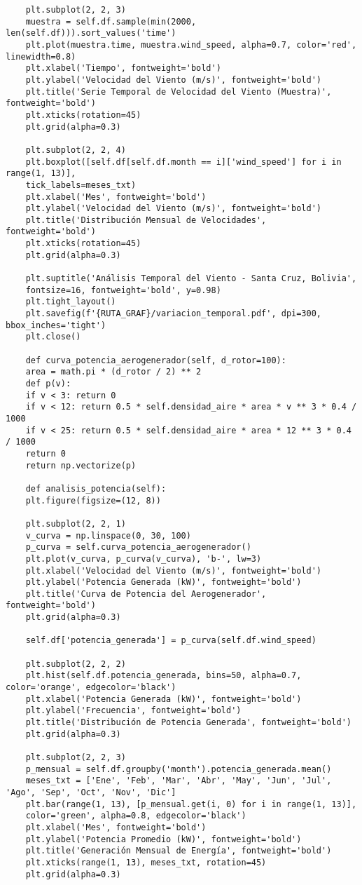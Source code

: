 \begin{lstlisting}
	plt.subplot(2, 2, 3)
	muestra = self.df.sample(min(2000, len(self.df))).sort_values('time')
	plt.plot(muestra.time, muestra.wind_speed, alpha=0.7, color='red', linewidth=0.8)
	plt.xlabel('Tiempo', fontweight='bold')
	plt.ylabel('Velocidad del Viento (m/s)', fontweight='bold')
	plt.title('Serie Temporal de Velocidad del Viento (Muestra)', fontweight='bold')
	plt.xticks(rotation=45)
	plt.grid(alpha=0.3)
	
	plt.subplot(2, 2, 4)
	plt.boxplot([self.df[self.df.month == i]['wind_speed'] for i in range(1, 13)],
	tick_labels=meses_txt)
	plt.xlabel('Mes', fontweight='bold')
	plt.ylabel('Velocidad del Viento (m/s)', fontweight='bold')
	plt.title('Distribución Mensual de Velocidades', fontweight='bold')
	plt.xticks(rotation=45)
	plt.grid(alpha=0.3)
	
	plt.suptitle('Análisis Temporal del Viento - Santa Cruz, Bolivia', 
	fontsize=16, fontweight='bold', y=0.98)
	plt.tight_layout()
	plt.savefig(f'{RUTA_GRAF}/variacion_temporal.pdf', dpi=300, bbox_inches='tight')
	plt.close()
	
	def curva_potencia_aerogenerador(self, d_rotor=100):
	area = math.pi * (d_rotor / 2) ** 2
	def p(v):
	if v < 3: return 0
	if v < 12: return 0.5 * self.densidad_aire * area * v ** 3 * 0.4 / 1000
	if v < 25: return 0.5 * self.densidad_aire * area * 12 ** 3 * 0.4 / 1000
	return 0
	return np.vectorize(p)
	
	def analisis_potencia(self):
	plt.figure(figsize=(12, 8))
	
	plt.subplot(2, 2, 1)
	v_curva = np.linspace(0, 30, 100)
	p_curva = self.curva_potencia_aerogenerador()
	plt.plot(v_curva, p_curva(v_curva), 'b-', lw=3)
	plt.xlabel('Velocidad del Viento (m/s)', fontweight='bold')
	plt.ylabel('Potencia Generada (kW)', fontweight='bold')
	plt.title('Curva de Potencia del Aerogenerador', fontweight='bold')
	plt.grid(alpha=0.3)
	
	self.df['potencia_generada'] = p_curva(self.df.wind_speed)
	
	plt.subplot(2, 2, 2)
	plt.hist(self.df.potencia_generada, bins=50, alpha=0.7, color='orange', edgecolor='black')
	plt.xlabel('Potencia Generada (kW)', fontweight='bold')
	plt.ylabel('Frecuencia', fontweight='bold')
	plt.title('Distribución de Potencia Generada', fontweight='bold')
	plt.grid(alpha=0.3)
	
	plt.subplot(2, 2, 3)
	p_mensual = self.df.groupby('month').potencia_generada.mean()
	meses_txt = ['Ene', 'Feb', 'Mar', 'Abr', 'May', 'Jun', 'Jul', 'Ago', 'Sep', 'Oct', 'Nov', 'Dic']
	plt.bar(range(1, 13), [p_mensual.get(i, 0) for i in range(1, 13)],
	color='green', alpha=0.8, edgecolor='black')
	plt.xlabel('Mes', fontweight='bold')
	plt.ylabel('Potencia Promedio (kW)', fontweight='bold')
	plt.title('Generación Mensual de Energía', fontweight='bold')
	plt.xticks(range(1, 13), meses_txt, rotation=45)
	plt.grid(alpha=0.3)
	

\end{lstlisting}
